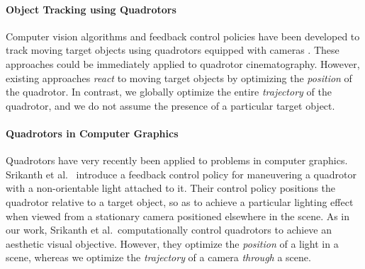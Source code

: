 \paragraph{Object Tracking using Quadrotors}
Computer vision algorithms and feedback control policies have been developed to track moving target objects using quadrotors equipped with cameras \cite{teuliere:2011}.
These approaches could be immediately applied to quadrotor cinematography.
However, existing approaches \emph{react} to moving target objects by optimizing the \emph{position} of the quadrotor.
In contrast, we globally optimize the entire \emph{trajectory} of the quadrotor, and we do not assume the presence of a particular target object.

\paragraph{Quadrotors in Computer Graphics}
Quadrotors have very recently been applied to problems in computer graphics.
Srikanth et al.~ introduce a feedback control policy for maneuvering a quadrotor with a non-orientable light attached to it.
Their control policy positions the quadrotor relative to a target object, so as to achieve a particular lighting effect when viewed from a stationary camera positioned elsewhere in the scene.
As in our work, Srikanth et al.~computationally control quadrotors to achieve an aesthetic visual objective.
However, they optimize the \emph{position} of a light in a scene, whereas we optimize the \emph{trajectory} of a camera \emph{through} a scene.
